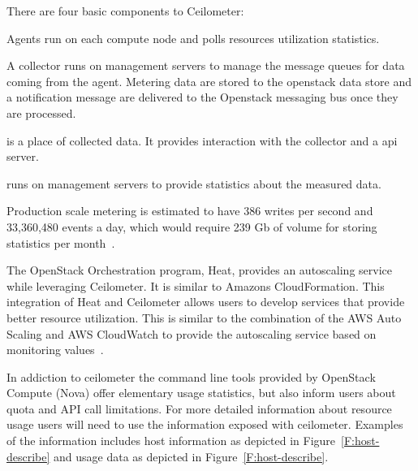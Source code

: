 \documentclass{sig-alternate-05-2015}
\begin{document}
There are four basic components to Ceilometer:

\begin{description}
\setlength\itemsep{-2pt} 

\item[\it Agents.] Agents run on each compute node and polls resources utilization statistics.

\item[\it Collector:] A collector runs on management servers to manage the message queues for data coming from the agent. Metering data are stored to the openstack data store and a notification message are delivered to the Openstack messaging bus once they are processed.

\item[\it Data store:] is a place of collected data. It provides interaction with the collector and a api server.

\item[\it API server:] runs on management servers to provide statistics about the measured data.

\end{description}

Production scale metering is estimated to have 386 writes per second and 33,360,480 events a day, which would require 239 Gb of volume for storing statistics per month~\cite{Barcet12}.

The OpenStack Orchestration program, Heat, provides an autoscaling service while leveraging Ceilometer. It is similar to Amazons CloudFormation.  This integration of Heat and Ceilometer allows users to develop services that provide better resource utilization. This is similar to the combination of the AWS Auto Scaling and AWS CloudWatch to provide the autoscaling service based on monitoring values~\cite{Abaakouk13}.

In addiction to ceilometer the command line tools provided by OpenStack Compute (Nova) offer elementary usage statistics, but also inform users about quota and API call limitations.  For more detailed information about resource usage users will need to use the information exposed with ceilometer.  Examples of the information includes host information as depicted in Figure~\ref{F:host-describe} and usage data as depicted in Figure~\ref{F:host-describe}.
\end{document}
